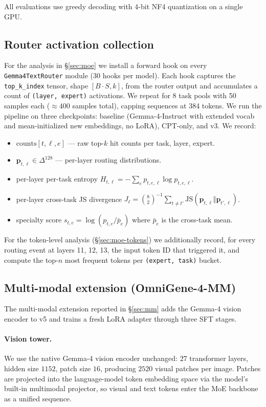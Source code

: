 \documentclass[11pt]{article}
\begin{document}
All evaluations use greedy decoding with 4-bit NF4 quantization on a single GPU.

\subsection{Router activation collection}
\label{sec:hooks}

For the analysis in \S\ref{sec:moe} we install a forward hook on every \texttt{Gemma4TextRouter} module (30 hooks per model). Each hook captures the \texttt{top\_k\_index} tensor, shape $[B \cdot S, k]$, from the router output and accumulates a count of \texttt{(layer, expert)} activations. We repeat for 8 task pools with 50 samples each ($\approx 400$ samples total), capping sequences at 384 tokens. We run the pipeline on three checkpoints: baseline (Gemma-4-Instruct with extended vocab and mean-initialized new embeddings, no LoRA), CPT-only, and v3. We record:
\begin{itemize}\setlength\itemsep{0pt}
\item $\mathrm{counts}[t, \ell, e]$ --- raw top-$k$ hit counts per task, layer, expert.
\item $\mathbf{p}_{t, \ell} \in \Delta^{128}$ --- per-layer routing distributions.
\item per-layer per-task entropy $H_{t,\ell} = -\sum_e p_{t,e,\ell} \log p_{t,e,\ell}$.
\item per-layer cross-task JS divergence $J_\ell = \binom{8}{2}^{-1} \sum_{t \neq t'} \mathrm{JS}(\mathbf{p}_{t,\ell} \Vert \mathbf{p}_{t',\ell})$.
\item specialty score $s_{t,e} = \log(p_{t,e} / \bar p_e)$ where $\bar p_e$ is the cross-task mean.
\end{itemize}

For the token-level analysis (\S\ref{sec:moe-tokens}) we additionally record, for every routing event at layers 11, 12, 13, the input token ID that triggered it, and compute the top-$n$ most frequent tokens per \texttt{(expert, task)} bucket.

\subsection{Multi-modal extension (OmniGene-4-MM)}
\label{sec:methods-mm}

The multi-modal extension reported in \S\ref{sec:mm} adds the Gemma-4 vision encoder to v5 and trains a fresh LoRA adapter through three SFT stages.

\paragraph{Vision tower.} We use the native Gemma-4 vision encoder \citep{gemmateam2025} unchanged: $27$ transformer layers, hidden size $1152$, patch size $16$, producing $2520$ visual patches per image. Patches are projected into the language-model token embedding space via the model's built-in multimodal projector, so visual and text tokens enter the MoE backbone as a unified sequence.
\end{document}
